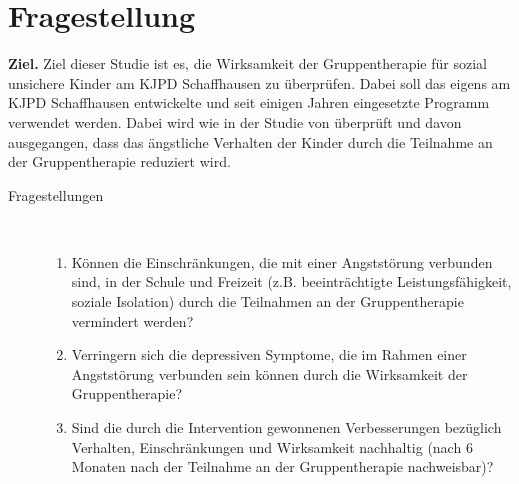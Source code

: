 %
%
\chapter{Fragestellung}\label{chap.fragestellung}
\glsresetall
\textbf{Ziel.} Ziel dieser Studie ist es, die Wirksamkeit der Gruppentherapie für sozial unsichere Kinder am KJPD Schaffhausen zu überprüfen. Dabei soll das eigens am KJPD Schaffhausen entwickelte und seit einigen Jahren eingesetzte Programm verwendet werden. Dabei wird wie in der Studie von  überprüft und davon ausgegangen, dass das ängstliche Verhalten der Kinder durch die Teilnahme an der Gruppentherapie reduziert wird.

\begin{description}
  \item[Fragestellungen]~\par
  \begin{enumerate}
      \item Können die Einschränkungen, die mit einer Angststörung verbunden sind, in der Schule und Freizeit (z.B. beeinträchtigte Leistungsfähigkeit, soziale Isolation) durch die Teilnahmen an der Gruppentherapie vermindert werden?
      \item Verringern sich die depressiven Symptome, die im Rahmen einer Angststörung verbunden sein können \cite{Essau2002} durch die Wirksamkeit der Gruppentherapie?
      \item Sind die durch die Intervention gewonnenen Verbesserungen bezüglich Verhalten, Einschränkungen und Wirksamkeit nachhaltig (nach 6 Monaten nach der Teilnahme an der Gruppentherapie nachweisbar)?
  \end{enumerate}
\end{description}  

